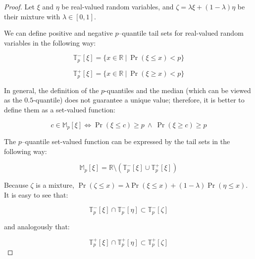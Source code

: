 \documentclass{article}
\theoremstyle{definition}
\begin{document}
\begin{proof}

    Let $\xi$ and $\eta$ be real-valued random variables, and $\zeta = \lambda \xi + (1-\lambda) \eta$ be their mixture with $\lambda \in [0,1]$.

    We can define positive and negative $p$–quantile \cite{book:DeGrootProbabilityAndStatistics,book:IntroToProbability} tail sets for real-valued random variables in the following way:

    \begin{equation}
        \mathbb{T}^{-}_p[\xi] = 
        \{ x \in \mathbb{R} \ | \ 
        \Pr(\xi \le x) < p
        \}
    \end{equation}

        \begin{equation}
        \mathbb{T}^{+}_p[\xi] = 
        \{ x \in \mathbb{R} \ | \ 
        \Pr(\xi \ge x) < p
        \}
    \end{equation}

    In general, the definition of the $p$-quantiles and the median (which can be viewed as the $0.5$-quantile) does not guarantee a unique value; therefore, it is better to define them as a set-valued function:

    \begin{equation}
        c \in \mathbb{M}_p[\xi]
        \iff
        \Pr(\xi \le c) \ge p
        \ \wedge \  
        \Pr(\xi \ge c) \ge p
    \end{equation}

    The $p$–quantile set-valued function can be expressed by the tail sets in the following way:

    \begin{equation}
        \mathbb{M}_p[\xi] = 
        \mathbb{R} \setminus
        (\mathbb{T}^{-}_p[\xi] \cup
        \mathbb{T}^{+}_p[\xi])
    \end{equation}

    Because $\zeta$ is a mixture, $\Pr(\zeta \le x) = \lambda \Pr(\xi \le x)+ (1-\lambda) \Pr(\eta \le x)$. It is easy to see that:

    \begin{equation}
        \mathbb{T}^{-}_p[\xi] \cap
        \mathbb{T}^{-}_p[\eta]
        \subset
        \mathbb{T}^{-}_p[\zeta]
    \end{equation}

    and analogously that:

    \begin{equation}
        \mathbb{T}^{+}_p[\xi] \cap
        \mathbb{T}^{+}_p[\eta]
        \subset
        \mathbb{T}^{+}_p[\zeta]
    \end{equation}


\end{proof}
\end{document}
